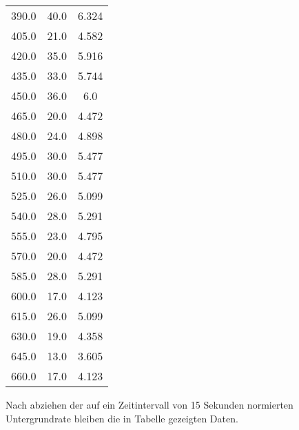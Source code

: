 \begin{table}
\begin{tabular}{c c c}
  390.0   & 40.0   & 6.324  \\  
  405.0   & 21.0   & 4.582  \\  
  420.0   & 35.0   & 5.916  \\  
  435.0   & 33.0   & 5.744  \\  
  450.0   & 36.0   & 6.0     \\  
  465.0   & 20.0   & 4.472  \\  
  480.0   & 24.0   & 4.898  \\  
  495.0   & 30.0   & 5.477  \\  
  510.0   & 30.0   & 5.477  \\  
  525.0   & 26.0   & 5.099  \\  
  540.0   & 28.0   & 5.291  \\  
  555.0   & 23.0   & 4.795  \\  
  570.0   & 20.0   & 4.472  \\  
  585.0   & 28.0   & 5.291  \\  
  600.0   & 17.0   & 4.123  \\  
  615.0   & 26.0   & 5.099  \\  
  630.0   & 19.0   & 4.358  \\  
  645.0   & 13.0   & 3.605  \\  
  660.0   & 17.0   & 4.123 \\
  \bottomrule
 \end{tabular}
\end{table} 

Nach abziehen der auf ein Zeitintervall von 15 Sekunden normierten Untergrundrate
bleiben die in Tabelle %
gezeigten Daten.

